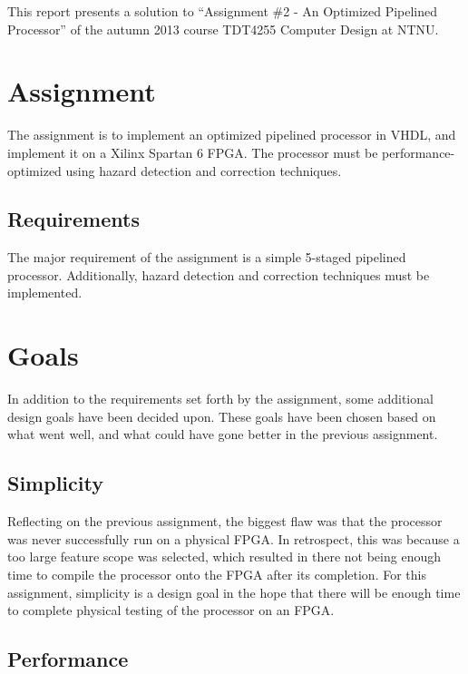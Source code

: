 This report presents a solution to ``Assignment \#2 - An Optimized Pipelined Processor'' of the autumn 2013 course TDT4255 Computer Design at NTNU.

\section{Assignment}

The assignment is to implement an optimized pipelined processor in VHDL, and implement it on a Xilinx Spartan 6 FPGA.
The processor must be performance-optimized using hazard detection and correction techniques.


\subsection{Requirements}

The major requirement of the assignment is a simple 5-staged pipelined processor\cn.
Additionally, hazard detection and correction techniques must be implemented.

\section{Goals}

In addition to the requirements set forth by the assignment, some additional design goals have been decided upon.
These goals have been chosen based on what went well, and what could have gone better in the previous assignment\cn.

\subsection{Simplicity}

Reflecting on the previous assignment\cn, the biggest flaw was that the processor was never successfully run on a physical FPGA.
In retrospect, this was because a too large feature scope was selected, which resulted in there not being enough time to compile the processor onto the FPGA after its completion.
For this assignment, simplicity is a design goal in the hope that there will be enough time to complete physical testing of the processor on an FPGA.

\subsection{Performance}

